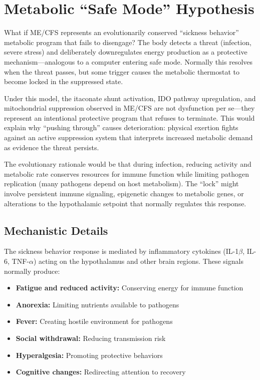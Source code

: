 
\section{Metabolic ``Safe Mode'' Hypothesis}
\label{sec:safe-mode}

\begin{open_question}
What if ME/CFS represents an evolutionarily conserved ``sickness behavior'' metabolic program that fails to disengage? The body detects a threat (infection, severe stress) and deliberately downregulates energy production as a protective mechanism---analogous to a computer entering safe mode. Normally this resolves when the threat passes, but some trigger causes the metabolic thermostat to become locked in the suppressed state.

Under this model, the itaconate shunt activation, IDO pathway upregulation, and mitochondrial suppression observed in ME/CFS are not dysfunction per se---they represent an intentional protective program that refuses to terminate. This would explain why ``pushing through'' causes deterioration: physical exertion fights against an active suppression system that interprets increased metabolic demand as evidence the threat persists.

The evolutionary rationale would be that during infection, reducing activity and metabolic rate conserves resources for immune function while limiting pathogen replication (many pathogens depend on host metabolism). The ``lock'' might involve persistent immune signaling, epigenetic changes to metabolic genes, or alterations to the hypothalamic setpoint that normally regulates this response.
\end{open_question}

\subsection{Mechanistic Details}

The sickness behavior response is mediated by inflammatory cytokines (IL-1$\beta$, IL-6, TNF-$\alpha$) acting on the hypothalamus and other brain regions. These signals normally produce:

\begin{itemize}
    \item \textbf{Fatigue and reduced activity:} Conserving energy for immune function
    \item \textbf{Anorexia:} Limiting nutrients available to pathogens
    \item \textbf{Fever:} Creating hostile environment for pathogens
    \item \textbf{Social withdrawal:} Reducing transmission risk
    \item \textbf{Hyperalgesia:} Promoting protective behaviors
    \item \textbf{Cognitive changes:} Redirecting attention to recovery
\end{itemize}

